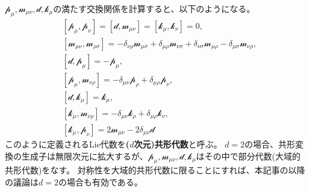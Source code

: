 \documentclass[\main/main.tex]{subfiles}
\begin{document}
$𝓅_μ, 𝓂_{μν}, 𝒹, 𝓀_μ$の満たす交換関係を計算すると、以下のようになる。
\begin{align}
    &
    [𝓅_μ, 𝓅_ν] = [𝒹,𝓂_{μν}] = [𝓀_μ,𝓀_ν] = 0,
    \\ &
    [𝓂_{μν},𝓂_{ρσ}]
    = -δ_{νρ}𝓂_{μσ}+δ_{μρ} 𝓂_{νσ}+δ_{νσ}𝓂_{μρ}-δ_{μσ}𝓂_{νρ},
    \\ &
    [𝒹,𝓅_μ] = -𝓅_μ,
    \\ &
    [𝓅_μ,𝓂_{νρ}] = -δ_{μν}𝓅_ρ + δ_{μρ}𝓅_ν,
    \\ &
    [𝒹,𝓀_μ] = 𝓀_μ,
    \\ &
    [𝓀_μ,𝓂_{νρ}] = -δ_{μν}𝓀_ρ + δ_{μρ}𝓀_ν,
    \\ &
    [𝓀_μ,𝓅_ν] = 2𝓂_{μν} - 2δ_{μν}𝒹
\end{align}
このように定義されるLie代数を\textbf{($d$次元)共形代数}と呼ぶ。
$d=2$の場合、共形変換の生成子は無限次元に拡大するが、$𝓅_μ,𝓂_{μν},𝒹,𝓀_μ$はその中で部分代数(大域的共形代数)をなす。
対称性を大域的共形代数に限ることにすれば、本記事の以降の議論は$d=2$の場合も有効である。
\end{document}
